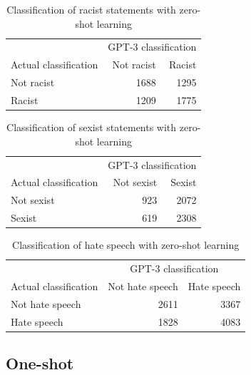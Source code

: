 \documentclass[12pt,]{article}
\begin{document}
\begin{table}[!h]

\caption{\label{tab:zeroshot-racism}Classification of racist statements with zero-shot learning}
\centering
\fontsize{8}{10}\selectfont
\begin{tabular}[t]{lrr}
\toprule
\multicolumn{1}{c}{ } & \multicolumn{2}{c}{GPT-3 classification} \\
\cmidrule(l{3pt}r{3pt}){2-3}
Actual classification & Not racist & Racist\\
\midrule
Not racist & 1688 & 1295\\
Racist & 1209 & 1775\\
\bottomrule
\end{tabular}
\end{table}

\begin{table}[!h]

\caption{\label{tab:zeroshot-sexism}Classification of sexist statements with zero-shot learning}
\centering
\fontsize{8}{10}\selectfont
\begin{tabular}[t]{lrr}
\toprule
\multicolumn{1}{c}{ } & \multicolumn{2}{c}{GPT-3 classification} \\
\cmidrule(l{3pt}r{3pt}){2-3}
Actual classification & Not sexist & Sexist\\
\midrule
Not sexist & 923 & 2072\\
Sexist & 619 & 2308\\
\bottomrule
\end{tabular}
\end{table}

\begin{table}[!h]

\caption{\label{tab:zeroshot-hate}Classification of hate speech with zero-shot learning}
\centering
\fontsize{8}{10}\selectfont
\begin{tabular}[t]{lrr}
\toprule
\multicolumn{1}{c}{ } & \multicolumn{2}{c}{GPT-3 classification} \\
\cmidrule(l{3pt}r{3pt}){2-3}
Actual classification & Not hate speech & Hate speech\\
\midrule
Not hate speech & 2611 & 3367\\
Hate speech & 1828 & 4083\\
\bottomrule
\end{tabular}
\end{table}

\newpage

\hypertarget{appendixboneshot}{%
\subsection{One-shot}\label{appendixboneshot}}
\end{document}
